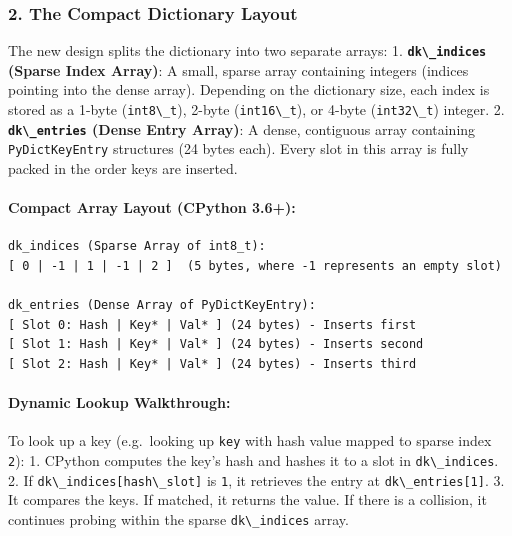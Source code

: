 \hypertarget{the-compact-dictionary-layout}{%
\subsubsection{2. The Compact Dictionary
Layout}\label{the-compact-dictionary-layout}}

The new design splits the dictionary into two separate arrays: 1.
\textbf{\passthrough{\lstinline!dk\_indices!} (Sparse Index Array)}: A
small, sparse array containing integers (indices pointing into the dense
array). Depending on the dictionary size, each index is stored as a
1-byte (\passthrough{\lstinline!int8\_t!}), 2-byte
(\passthrough{\lstinline!int16\_t!}), or 4-byte
(\passthrough{\lstinline!int32\_t!}) integer. 2.
\textbf{\passthrough{\lstinline!dk\_entries!} (Dense Entry Array)}: A
dense, contiguous array containing
\passthrough{\lstinline!PyDictKeyEntry!} structures (24 bytes each).
Every slot in this array is fully packed in the order keys are inserted.

\hypertarget{compact-array-layout-cpython-3.6}{%
\paragraph{Compact Array Layout (CPython
3.6+):}\label{compact-array-layout-cpython-3.6}}

\begin{lstlisting}
dk_indices (Sparse Array of int8_t):
[ 0 | -1 | 1 | -1 | 2 ]  (5 bytes, where -1 represents an empty slot)

dk_entries (Dense Array of PyDictKeyEntry):
[ Slot 0: Hash | Key* | Val* ] (24 bytes) - Inserts first
[ Slot 1: Hash | Key* | Val* ] (24 bytes) - Inserts second
[ Slot 2: Hash | Key* | Val* ] (24 bytes) - Inserts third
\end{lstlisting}

\hypertarget{dynamic-lookup-walkthrough}{%
\paragraph{Dynamic Lookup
Walkthrough:}\label{dynamic-lookup-walkthrough}}

To look up a key (e.g.~looking up \passthrough{\lstinline!key!} with
hash value mapped to sparse index \passthrough{\lstinline!2!}): 1.
CPython computes the key's hash and hashes it to a slot in
\passthrough{\lstinline!dk\_indices!}. 2. If
\passthrough{\lstinline!dk\_indices[hash\_slot]!} is
\passthrough{\lstinline!1!}, it retrieves the entry at
\passthrough{\lstinline!dk\_entries[1]!}. 3. It compares the keys. If
matched, it returns the value. If there is a collision, it continues
probing within the sparse \passthrough{\lstinline!dk\_indices!} array.

